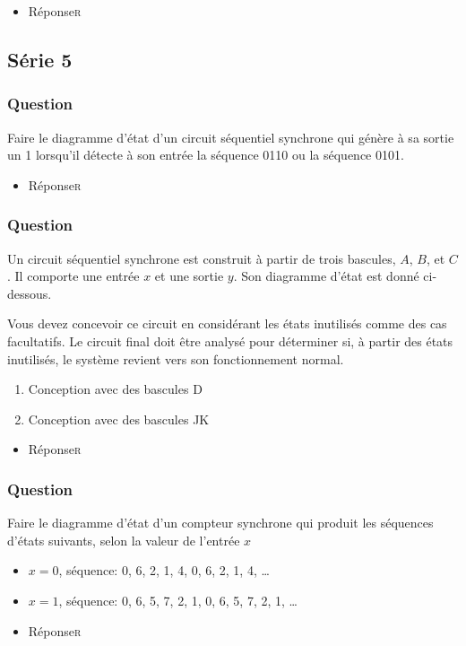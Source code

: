 \documentclass[11pt]{article}
\begin{document}
\begin{itemize}
\item Réponse\hfill{}\textsc{r}
\label{sec:org848b66c}
\end{itemize}

\subsection*{Série 5}
\label{sec:org22262d9}
\subsubsection*{Question}
\label{sec:org978eb3b}
Faire le diagramme d'état d'un circuit séquentiel synchrone qui génère
à sa sortie un 1 lorsqu'il détecte à son entrée la séquence 0110 ou la
séquence 0101.

\begin{itemize}
\item Réponse\hfill{}\textsc{r}
\label{sec:org34c065c}
\end{itemize}

\subsubsection*{Question}
\label{sec:org2a9efab}
Un circuit séquentiel synchrone est construit à partir de trois
   bascules, \(A\), \(B\), et \(C\). Il comporte une entrée \(x\) et
   une sortie \(y\). Son diagramme d'état est donné ci-dessous. 
\begin{center}

\end{center}

Vous devez concevoir ce circuit en considérant les états inutilisés
comme des cas facultatifs. Le circuit final doit être analysé pour
déterminer si, à partir des états inutilisés, le système revient vers
son fonctionnement normal.
\begin{enumerate}
\item Conception avec des bascules D
\item Conception avec des bascules JK
\end{enumerate}

\begin{itemize}
\item Réponse\hfill{}\textsc{r}
\label{sec:org55ea2df}
\end{itemize}

\subsubsection*{Question}
\label{sec:org8df9f0f}
Faire le diagramme d'état d'un compteur synchrone qui produit les
  séquences d'états suivants, selon la valeur de l'entrée \(x\)

\begin{itemize}
\item \(x=0\), séquence: 0, 6, 2, 1, 4, 0, 6, 2, 1, 4, \dots{}
\item \(x=1\), séquence: 0, 6, 5, 7, 2, 1, 0, 6, 5, 7, 2, 1, \dots{}
\end{itemize}

\begin{itemize}
\item Réponse\hfill{}\textsc{r}
\label{sec:org31a6911}
\end{itemize}
\end{document}
